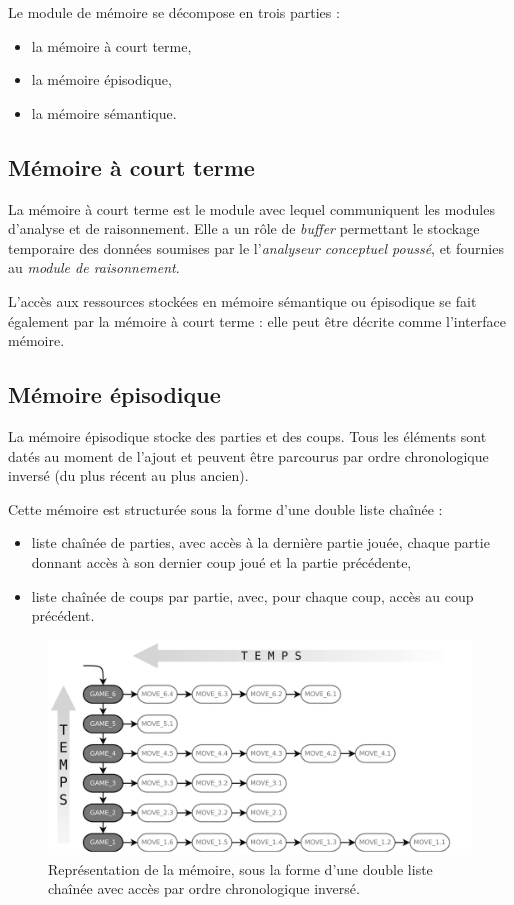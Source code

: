 Le module de mémoire se décompose en trois parties :
\begin{itemize}
\item la mémoire à court terme,
\item la mémoire épisodique,
\item la mémoire sémantique.
\end{itemize}

\subsection{Mémoire à court terme}

La mémoire à court terme est le module avec lequel communiquent les modules d'analyse et de raisonnement. Elle a un rôle de \emph{buffer} permettant le stockage temporaire des données soumises par le l'\emph{analyseur conceptuel poussé}, et fournies au \emph{module de raisonnement}.

L'accès aux ressources stockées en mémoire sémantique ou épisodique se fait également par la mémoire à court terme : elle peut être décrite comme l'interface mémoire.

\subsection{Mémoire épisodique}
\label{conception_memoire_episodique}

La mémoire épisodique stocke des parties et des coups. Tous les éléments sont datés au moment de l'ajout et peuvent être parcourus par ordre chronologique inversé (du plus récent au plus ancien).

Cette mémoire est structurée sous la forme d'une double liste chaînée :
\begin{itemize}
\item liste chaînée de parties, avec accès à la dernière partie jouée, chaque partie donnant accès à son dernier coup joué et la partie précédente,
\item liste chaînée de coups par partie, avec, pour chaque coup, accès au coup précédent.
\end{itemize}

\begin{figure}[H]
\includegraphics[width=\textwidth]{files/memoire/episodic_general}
\caption{Représentation de la mémoire, sous la forme d'une double liste chaînée avec accès par ordre chronologique inversé.}
\end{figure}

